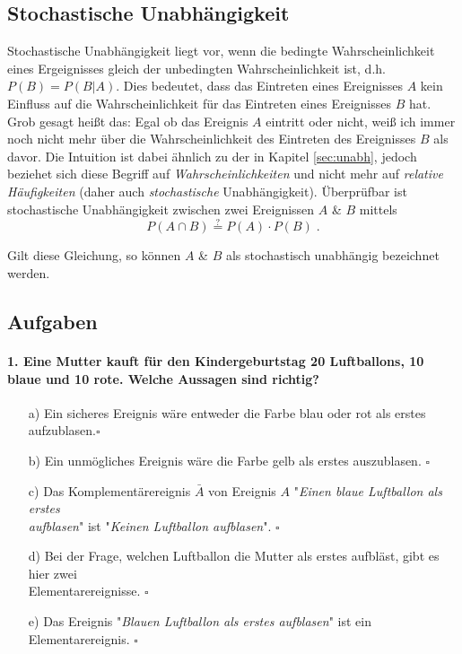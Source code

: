 \documentclass[a4paper]{article}
\begin{document}
\clearpage 

\subsection{Stochastische Unabhängigkeit}\label{sec:sto-unabh}
Stochastische Unabhängigkeit liegt vor, wenn die bedingte Wahrscheinlichkeit eines Ergeignisses gleich der unbedingten Wahrscheinlichkeit ist, d.h. $P(B) = P(B|A)$. Dies bedeutet, dass das Eintreten eines Ereignisses $A$ kein Einfluss auf die Wahrscheinlichkeit für das Eintreten eines Ereignisses $B$ hat. Grob gesagt heißt das: Egal ob das Ereignis $A$ eintritt oder nicht, weiß ich immer noch nicht mehr über die Wahrscheinlichkeit des Eintreten des Ereignisses $B$ als davor. Die Intuition ist dabei ähnlich zu der in Kapitel \ref{sec:unabh}, jedoch beziehet sich diese Begriff auf \textit{Wahrscheinlichkeiten} und nicht mehr auf \textit{relative Häufigkeiten} (daher auch \textit{stochastische} Unabhängigkeit).
Überprüfbar ist stochastische Unabhängigkeit zwischen zwei Ereignissen $A$ \& $B$ mittels
$$P(A \cap B) \stackrel{?}{=} P(A) \cdot P(B)\;.$$

\noindent Gilt diese Gleichung, so können $A$ \& $B$ als stochastisch unabhängig bezeichnet werden.

\clearpage
\subsection{Aufgaben}
\paragraph{1. Eine Mutter kauft für den Kindergeburtstag 20 Luftballons, 10 blaue und 10 rote. Welche Aussagen sind richtig?}
\begin{itemize}
    \item[a)] Ein sicheres Ereignis wäre entweder die Farbe blau oder rot als erstes aufzublasen.\hfill $\square$
    \item[b)] Ein unmögliches Ereignis wäre die Farbe gelb als erstes auszublasen. \hfill $\square$
    \item[c)] Das Komplementärereignis $\bar A$ von Ereignis $A$ "\textit{Einen blaue Luftballon als erstes \\aufblasen}" ist "\textit{Keinen Luftballon aufblasen}". \hfill  $\square$
    \item[d)] Bei der Frage, welchen Luftballon die Mutter als erstes aufbläst, gibt es hier zwei\\ Elementarereignisse. \hfill $\square$
    \item[e)] Das Ereignis "\textit{Blauen Luftballon als erstes aufblasen}" ist ein Elementarereignis. \hfill $\square$
\end{itemize}
\end{document}
